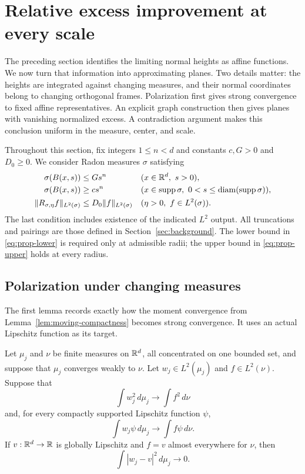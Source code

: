 \section{Relative excess improvement at every scale}
\label{sec:excess-propagation}

The preceding section identifies the limiting normal heights as affine
functions. We now turn that information into approximating planes.
Two details matter: the heights are integrated against changing measures,
and their normal coordinates belong to changing orthogonal frames.
Polarization first gives strong convergence to fixed affine
representatives. An explicit graph construction then gives planes with
vanishing normalized excess. A contradiction argument makes this
conclusion uniform in the measure, center, and scale.

Throughout this section, fix integers $1\le n<d$ and constants
$c,G>0$ and $D_0\ge0$. We consider Radon measures $\sigma$ satisfying
\begin{align}
 \sigma(B(x,s))&\le Gs^n
       &&(x\in\mathbb R^d,\ s>0),\label{eq:prop-upper}\\
 \sigma(B(x,s))&\ge cs^n
       &&(x\in\operatorname{supp}\sigma,\ 0<s\le\operatorname{diam}(\operatorname{supp}\sigma)),
       \label{eq:prop-lower}\\
 \|R_{\sigma,\eta}f\|_{L^2(\sigma)}
   &\le D_0\|f\|_{L^2(\sigma)}
       &&(\eta>0,\ f\in L^2(\sigma)).\label{eq:prop-riesz}
\end{align}
The last condition includes existence of the indicated $L^2$ output.
All truncations and pairings are those defined in Section~\ref{sec:background}.
The lower bound in \eqref{eq:prop-lower} is required only at admissible
radii; the upper bound in \eqref{eq:prop-upper} holds at every radius.

\subsection{Polarization under changing measures}

The first lemma records exactly how the moment convergence from
Lemma~\ref{lem:moving-compactness} becomes strong convergence. It uses an
actual Lipschitz function as its target.

\begin{lemma}
\label{lem:affine-polarization}
Let $\mu_j$ and $\nu$ be finite measures on $\mathbb R^d$, all concentrated on
one bounded set, and suppose that $\mu_j$ converges weakly to $\nu$.
Let $w_j\in L^2(\mu_j)$ and $f\in L^2(\nu)$. Suppose that
\begin{equation}\label{eq:polarization-norm}
 \int w_j^2\,d\mu_j\longrightarrow\int f^2\,d\nu
\end{equation}
and, for every compactly supported Lipschitz function $\psi$,
\begin{equation}\label{eq:polarization-moment}
 \int w_j\psi\,d\mu_j\longrightarrow\int f\psi\,d\nu.
\end{equation}
If $v:\mathbb R^d\to\mathbb R$ is globally Lipschitz and $f=v$ almost everywhere
for $\nu$, then
\[
 \int|w_j-v|^2\,d\mu_j\longrightarrow0.
\]
\end{lemma}

